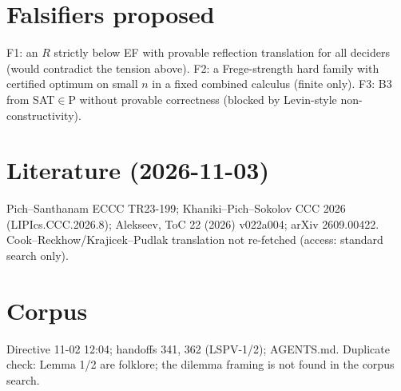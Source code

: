\documentclass{article}\usepackage{amsmath,amssymb}
\begin{document}
\section*{Falsifiers proposed}
F1: an $R$ strictly below EF with provable reflection translation for all deciders (would contradict the tension above). F2: a Frege-strength hard family with certified optimum on small $n$ in a fixed combined calculus (finite only). F3: B3 from SAT$\in$P without provable correctness (blocked by Levin-style non-constructivity).
\section*{Literature (2026-11-03)} Pich--Santhanam ECCC TR23-199; Khaniki--Pich--Sokolov CCC 2026 (LIPIcs.CCC.2026.8); Alekseev, ToC 22 (2026) v022a004; arXiv 2609.00422. Cook--Reckhow/Krajicek--Pudlak translation not re-fetched (access: standard search only).
\section*{Corpus} Directive 11-02 12:04; handoffs 341, 362 (LSPV-1/2); AGENTS.md. Duplicate check: Lemma 1/2 are folklore; the dilemma framing is not found in the corpus search.
\end{document}
